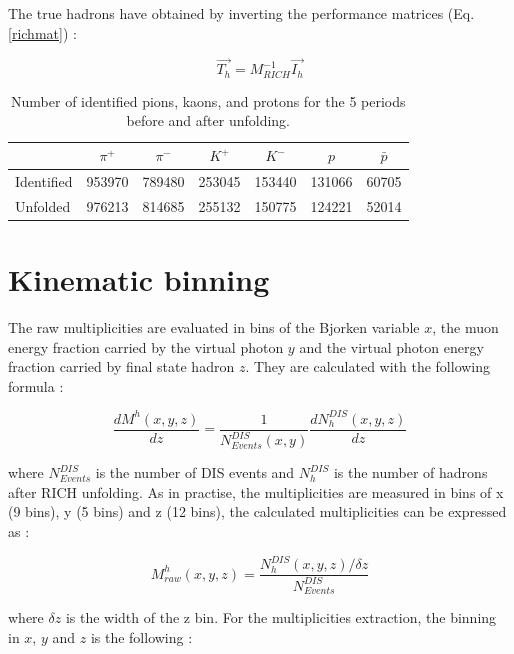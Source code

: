 The true hadrons have obtained by inverting the performance matrices (Eq. \ref{richmat}) :

\begin{equation}
  \overrightarrow{T_h} = M^{-1}_{RICH}\overrightarrow{I_h}
	\label{richmat}
\end{equation}

\begin{table}[!h]
  \caption{\label{HadNum} Number of identified pions, kaons, and protons for the 5 periods before and after unfolding.}
  \centering
  \begin{tabular}{lcccccc}
    \hline
     & $\pi^+$ & $\pi^-$ & $K^+$ & $K^-$ & $p$ & $\bar{p}$ \\
    \hline
    Identified & 953970 & 789480 & 253045 & 153440 & 131066 & 60705 \\
    Unfolded & 976213 & 814685 & 255132 & 150775 & 124221 & 52014 \\
    \hline
  \end{tabular}
\end{table}


\section{Kinematic binning}

The raw multiplicities are evaluated in bins of the Bjorken variable $x$, the muon energy fraction carried by the virtual photon $y$ and the virtual photon energy fraction carried by final state hadron $z$. They are calculated with the following formula :

\begin{equation}
  \frac{dM^h(x,y,z)}{dz}=\frac{1}{N^{DIS}_{Events}(x,y)}\frac{dN^{DIS}_{h}(x,y,z)}{dz}
\end{equation}

where $N^{DIS}_{Events}$ is the number of DIS events and $N^{DIS}_{h}$ is the number of
hadrons after RICH unfolding. As in practise, the multiplicities are measured in bins of
x (9 bins), y (5 bins) and z (12 bins), the calculated multiplicities can be expressed as :

\begin{equation}
  M^h_{raw}(x,y,z) = \frac{N^{DIS}_{h}(x,y,z)/\delta z}{N^{DIS}_{Events}}
\end{equation}

where $\delta z$ is the width of the z bin. For the multiplicities extraction, the binning in
$x$, $y$ and $z$ is the following :

